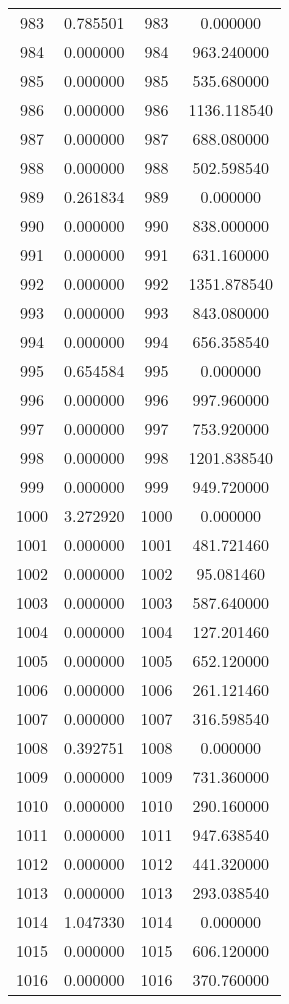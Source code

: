 \documentclass[12pt]{article}
\begin{document}
\begin{longtable}{@{}cccc@{}}
983 & 0.785501 & 983 & 0.000000 \\
984 & 0.000000 & 984 & 963.240000 \\
985 & 0.000000 & 985 & 535.680000 \\
986 & 0.000000 & 986 & 1136.118540 \\
987 & 0.000000 & 987 & 688.080000 \\
988 & 0.000000 & 988 & 502.598540 \\
989 & 0.261834 & 989 & 0.000000 \\
990 & 0.000000 & 990 & 838.000000 \\
991 & 0.000000 & 991 & 631.160000 \\
992 & 0.000000 & 992 & 1351.878540 \\
993 & 0.000000 & 993 & 843.080000 \\
994 & 0.000000 & 994 & 656.358540 \\
995 & 0.654584 & 995 & 0.000000 \\
996 & 0.000000 & 996 & 997.960000 \\
997 & 0.000000 & 997 & 753.920000 \\
998 & 0.000000 & 998 & 1201.838540 \\
999 & 0.000000 & 999 & 949.720000 \\
1000 & 3.272920 & 1000 & 0.000000 \\
1001 & 0.000000 & 1001 & 481.721460 \\
1002 & 0.000000 & 1002 & 95.081460 \\
1003 & 0.000000 & 1003 & 587.640000 \\
1004 & 0.000000 & 1004 & 127.201460 \\
1005 & 0.000000 & 1005 & 652.120000 \\
1006 & 0.000000 & 1006 & 261.121460 \\
1007 & 0.000000 & 1007 & 316.598540 \\
1008 & 0.392751 & 1008 & 0.000000 \\
1009 & 0.000000 & 1009 & 731.360000 \\
1010 & 0.000000 & 1010 & 290.160000 \\
1011 & 0.000000 & 1011 & 947.638540 \\
1012 & 0.000000 & 1012 & 441.320000 \\
1013 & 0.000000 & 1013 & 293.038540 \\
1014 & 1.047330 & 1014 & 0.000000 \\
1015 & 0.000000 & 1015 & 606.120000 \\
1016 & 0.000000 & 1016 & 370.760000 \\

\end{longtable}
\end{document}

